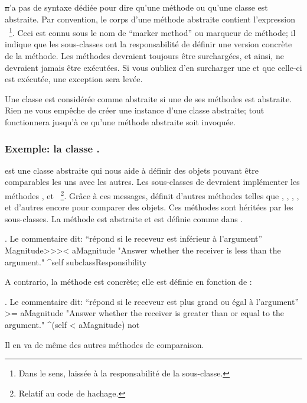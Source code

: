 \documentclass[a4paper,10pt,twoside]{book}
\begin{document}
\st n'a pas de syntaxe d\'edi\'ee pour dire qu'une m\'ethode ou qu'une classe est abstraite. 
Par convention, le corps d'une m\'ethode abstraite contient l'expression ~\footnote{Dans le sens, laiss\'ee \`a la responsabilit\'e de la sous-classe.}. 
Ceci est connu sous le nom de ``marker method'' ou marqueur de m\'ethode; il indique que les sous-classes ont la responsabilit\'e de d\'efinir une version concr\`ete de la m\'ethode. 
Les m\'ethodes  devraient toujours \^etre surcharg\'ees, et ainsi, ne devraient jamais \^etre ex\'ecut\'ees.
Si vous oubliez d'en surcharger une et que celle-ci est ex\'ecut\'ee, une exception sera lev\'ee. 

Une classe est consid\'er\'ee comme abstraite si une de ses m\'ethodes est abstraite.
Rien ne vous emp\^eche de cr\'eer une instance d'une classe abstraite; tout fonctionnera jusqu'\`a ce qu'une m\'ethode abstraite soit invoqu\'ee. 

\subsubsection{Exemple: la classe .}
 est une classe abstraite qui nous aide \`a d\'efinir
des objets pouvant \^etre comparables les uns avec les autres. Les
sous-classes de  devraient impl\'ementer les m\'ethodes
\ct{<}, \ct{=} et ~\footnote{Relatif au code de hachage.}.
Gr\^ace \`a ces messages,  d\'efinit d'autres m\'ethodes telles que
\ct{>}, \ct{>=}, \ct{<=}, ,   et
d'autres encore pour comparer des objets.
Ces m\'ethodes sont h\'erit\'ees par les sous-classes.
La m\'ethode  est abstraite et est d\'efinie comme
dans .

\begin{method}[MagnitudeLessThan]{. Le commentaire dit: ``r\'epond si le receveur est inf\'erieur \`a l'argument''}
Magnitude>>>< aMagnitude 
	"Answer whether the receiver is less than the argument."
	^self subclassResponsibility
\end{method}

\noindent
A contrario, la m\'ethode  est concr\`ete; elle est d\'efinie en fonction de \ct{<}:

\begin{method}[Magnitude>=]{. Le commentaire dit: ``r\'epond si le receveur est plus grand ou \'egal \`a l'argument''}
>= aMagnitude 
	"Answer whether the receiver is greater than or equal to the argument."
	^(self < aMagnitude) not
\end{method}
Il en va de m\^eme des autres m\'ethodes de comparaison.
\end{document}
